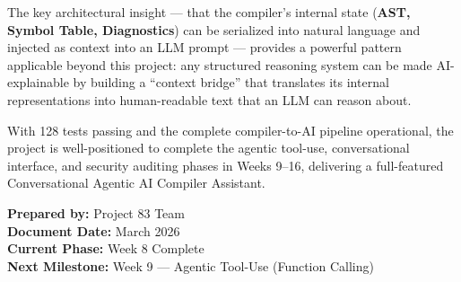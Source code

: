 \documentclass[a4paper,11pt]{article}
\begin{document}
The key architectural insight --- that the compiler's internal state (\textbf{AST, Symbol Table, Diagnostics}) can be serialized into natural language and injected as context into an LLM prompt --- provides a powerful pattern applicable beyond this project: any structured reasoning system can be made AI-explainable by building a ``context bridge'' that translates its internal representations into human-readable text that an LLM can reason about.

With 128 tests passing and the complete compiler-to-AI pipeline operational, the project is well-positioned to complete the agentic tool-use, conversational interface, and security auditing phases in Weeks 9--16, delivering a full-featured Conversational Agentic AI Compiler Assistant.

\vspace{1cm}
\noindent\textbf{Prepared by:} Project 83 Team \\
\textbf{Document Date:} March 2026 \\
\textbf{Current Phase:} Week 8 Complete \\
\textbf{Next Milestone:} Week 9 --- Agentic Tool-Use (Function Calling)
\end{document}
